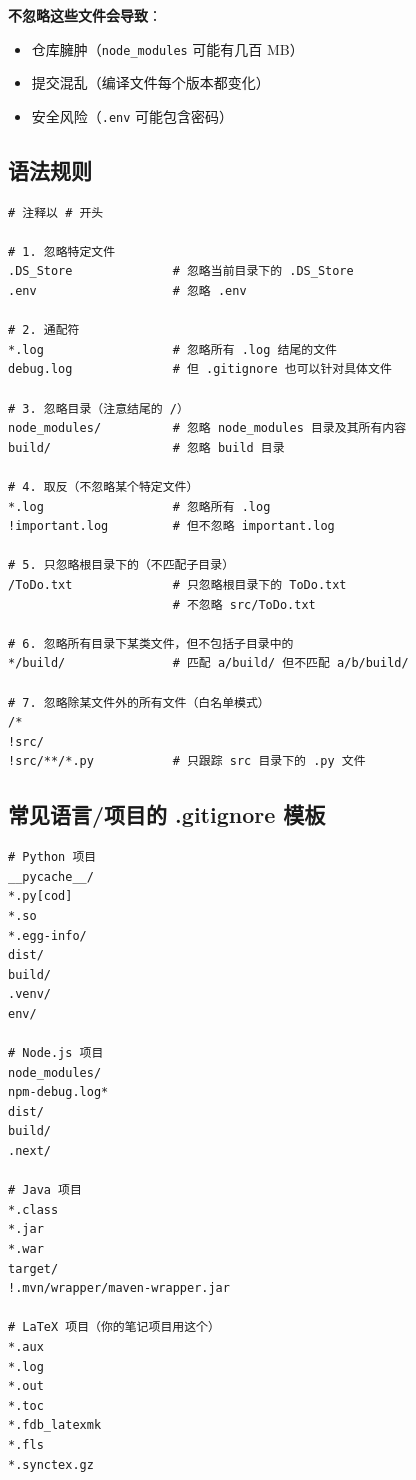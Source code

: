 \documentclass[12pt,a4paper]{article}
\begin{document}
\textbf{不忽略这些文件会导致}：
\begin{itemize}[itemsep=3pt]
    \item 仓库臃肿（\texttt{node\_modules} 可能有几百 MB）
    \item 提交混乱（编译文件每个版本都变化）
    \item 安全风险（\texttt{.env} 可能包含密码）
\end{itemize}

\subsection{语法规则}

\begin{lstlisting}
# 注释以 # 开头

# 1. 忽略特定文件
.DS_Store              # 忽略当前目录下的 .DS_Store
.env                   # 忽略 .env

# 2. 通配符
*.log                  # 忽略所有 .log 结尾的文件
debug.log              # 但 .gitignore 也可以针对具体文件

# 3. 忽略目录（注意结尾的 /）
node_modules/          # 忽略 node_modules 目录及其所有内容
build/                 # 忽略 build 目录

# 4. 取反（不忽略某个特定文件）
*.log                  # 忽略所有 .log
!important.log         # 但不忽略 important.log

# 5. 只忽略根目录下的（不匹配子目录）
/ToDo.txt              # 只忽略根目录下的 ToDo.txt
                       # 不忽略 src/ToDo.txt

# 6. 忽略所有目录下某类文件，但不包括子目录中的
*/build/               # 匹配 a/build/ 但不匹配 a/b/build/

# 7. 忽略除某文件外的所有文件（白名单模式）
/*
!src/
!src/**/*.py           # 只跟踪 src 目录下的 .py 文件
\end{lstlisting}

\subsection{常见语言/项目的 .gitignore 模板}

\begin{lstlisting}
# Python 项目
__pycache__/
*.py[cod]
*.so
*.egg-info/
dist/
build/
.venv/
env/

# Node.js 项目
node_modules/
npm-debug.log*
dist/
build/
.next/

# Java 项目
*.class
*.jar
*.war
target/
!.mvn/wrapper/maven-wrapper.jar

# LaTeX 项目（你的笔记项目用这个）
*.aux
*.log
*.out
*.toc
*.fdb_latexmk
*.fls
*.synctex.gz
\end{lstlisting}
\end{document}
